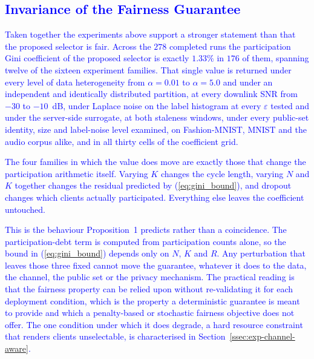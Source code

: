 \documentclass[journal]{IEEEtran}
\newcommand{\rev}[1]{\textcolor{blue}{#1}}
\begin{document}
\rev{\subsection{Invariance of the Fairness Guarantee}
\label{ssec:exp-invariance}

Taken together the experiments above support a stronger statement than that the proposed selector is fair. Across the $278$ completed runs the participation Gini coefficient of the proposed selector is exactly $1.33\%$ in $176$ of them, spanning twelve of the sixteen experiment families. That single value is returned under every level of data heterogeneity from $\alpha = 0.01$ to $\alpha = 5.0$ and under an independent and identically distributed partition, at every downlink SNR from $-30$ to $-10$~dB, under Laplace noise on the label histogram at every $\varepsilon$ tested and under the server-side surrogate, at both staleness windows, under every public-set identity, size and label-noise level examined, on Fashion-MNIST, MNIST and the audio corpus alike, and in all thirty cells of the coefficient grid.

The four families in which the value does move are exactly those that change the participation arithmetic itself. Varying $K$ changes the cycle length, varying $N$ and $K$ together changes the residual predicted by (\ref{eq:gini_bound}), and dropout changes which clients actually participated. Everything else leaves the coefficient untouched.

This is the behaviour Proposition~1 predicts rather than a coincidence. The participation-debt term is computed from participation counts alone, so the bound in (\ref{eq:gini_bound}) depends only on $N$, $K$ and $R$. Any perturbation that leaves those three fixed cannot move the guarantee, whatever it does to the data, the channel, the public set or the privacy mechanism. The practical reading is that the fairness property can be relied upon without re-validating it for each deployment condition, which is the property a deterministic guarantee is meant to provide and which a penalty-based or stochastic fairness objective does not offer. The one condition under which it does degrade, a hard resource constraint that renders clients unselectable, is characterised in Section~\ref{ssec:exp-channel-aware}.}

\end{document}
